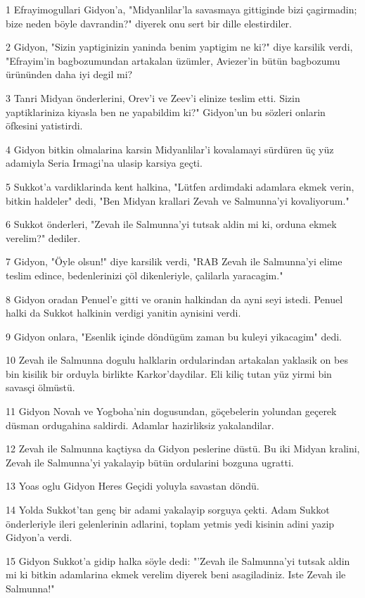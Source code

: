 \par 1 Efrayimogullari Gidyon'a, "Midyanlilar'la savasmaya gittiginde bizi çagirmadin; bize neden böyle davrandin?" diyerek onu sert bir dille elestirdiler.
\par 2 Gidyon, "Sizin yaptiginizin yaninda benim yaptigim ne ki?" diye karsilik verdi, "Efrayim'in bagbozumundan artakalan üzümler, Aviezer'in bütün bagbozumu ürününden daha iyi degil mi?
\par 3 Tanri Midyan önderlerini, Orev'i ve Zeev'i elinize teslim etti. Sizin yaptiklariniza kiyasla ben ne yapabildim ki?" Gidyon'un bu sözleri onlarin öfkesini yatistirdi.
\par 4 Gidyon bitkin olmalarina karsin Midyanlilar'i kovalamayi sürdüren üç yüz adamiyla Seria Irmagi'na ulasip karsiya geçti.
\par 5 Sukkot'a vardiklarinda kent halkina, "Lütfen ardimdaki adamlara ekmek verin, bitkin haldeler" dedi, "Ben Midyan krallari Zevah ve Salmunna'yi kovaliyorum."
\par 6 Sukkot önderleri, "Zevah ile Salmunna'yi tutsak aldin mi ki, orduna ekmek verelim?" dediler.
\par 7 Gidyon, "Öyle olsun!" diye karsilik verdi, "RAB Zevah ile Salmunna'yi elime teslim edince, bedenlerinizi çöl dikenleriyle, çalilarla yaracagim."
\par 8 Gidyon oradan Penuel'e gitti ve oranin halkindan da ayni seyi istedi. Penuel halki da Sukkot halkinin verdigi yanitin aynisini verdi.
\par 9 Gidyon onlara, "Esenlik içinde döndügüm zaman bu kuleyi yikacagim" dedi.
\par 10 Zevah ile Salmunna dogulu halklarin ordularindan artakalan yaklasik on bes bin kisilik bir orduyla birlikte Karkor'daydilar. Eli kiliç tutan yüz yirmi bin savasçi ölmüstü.
\par 11 Gidyon Novah ve Yogboha'nin dogusundan, göçebelerin yolundan geçerek düsman ordugahina saldirdi. Adamlar hazirliksiz yakalandilar.
\par 12 Zevah ile Salmunna kaçtiysa da Gidyon peslerine düstü. Bu iki Midyan kralini, Zevah ile Salmunna'yi yakalayip bütün ordularini bozguna ugratti.
\par 13 Yoas oglu Gidyon Heres Geçidi yoluyla savastan döndü.
\par 14 Yolda Sukkot'tan genç bir adami yakalayip sorguya çekti. Adam Sukkot önderleriyle ileri gelenlerinin adlarini, toplam yetmis yedi kisinin adini yazip Gidyon'a verdi.
\par 15 Gidyon Sukkot'a gidip halka söyle dedi: "'Zevah ile Salmunna'yi tutsak aldin mi ki bitkin adamlarina ekmek verelim diyerek beni asagiladiniz. Iste Zevah ile Salmunna!"
